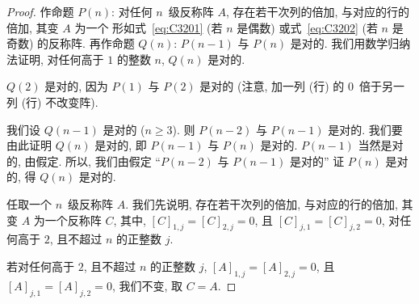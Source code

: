 \documentclass[../libro.tex]{subfiles}
\begin{document}
\begin{proof}
    作命题 \(P(n)\):
    对任何 \(n\)~级反称阵 \(A\),
    存在若干次列的倍加, 与对应的行的倍加,
    其变 \(A\) 为一个%
    形如式~\eqref{eq:C3201} (若 \(n\) 是偶数)
    或式~\eqref{eq:C3202} (若 \(n\) 是奇数)
    的反称阵.
    再作命题 \(Q(n)\):
    \(P(n-1)\) 与 \(P(n)\) 是对的.
    我们用数学归纳法证明,
    对任何高于 \(1\) 的整数 \(n\), \(Q(n)\) 是对的.

    \(Q(2)\) 是对的,
    因为 \(P(1)\) 与 \(P(2)\) 是对的
    (注意, %
    加一列 (行) 的 \(0\)~倍于另一列 (行)
    不改变阵). %

    我们设 \(Q(n-1)\) 是对的 (\(n \geq 3\)).
    则 \(P(n-2)\) 与 \(P(n-1)\) 是对的.
    我们要由此证明 \(Q(n)\) 是对的,
    即 \(P(n-1)\) 与 \(P(n)\) 是对的.
    \(P(n-1)\) 当然是对的, 由假定.
    所以, 我们由假定
    ``\(P(n-2)\) 与 \(P(n-1)\) 是对的''
    证 \(P(n)\) 是对的,
    得 \(Q(n)\) 是对的.

    任取一个 \(n\)~级反称阵 \(A\).
    我们先说明,
    存在若干次列的倍加, 与对应的行的倍加,
    其变 \(A\) 为一个反称阵 \(C\),
    其中,
    \([C]_{1,j} = [C]_{2,j} = 0\),
    且 \([C]_{j,1} = [C]_{j,2} = 0\),
    对任何高于 \(2\), 且不超过 \(n\) 的正整数 \(j\).

    若对任何高于 \(2\), 且不超过 \(n\) 的正整数 \(j\),
    \([A]_{1,j} = [A]_{2,j} = 0\),
    且 \([A]_{j,1} = [A]_{j,2} = 0\),
    我们不变, 取 \(C = A\).


\end{proof}
\end{document}
